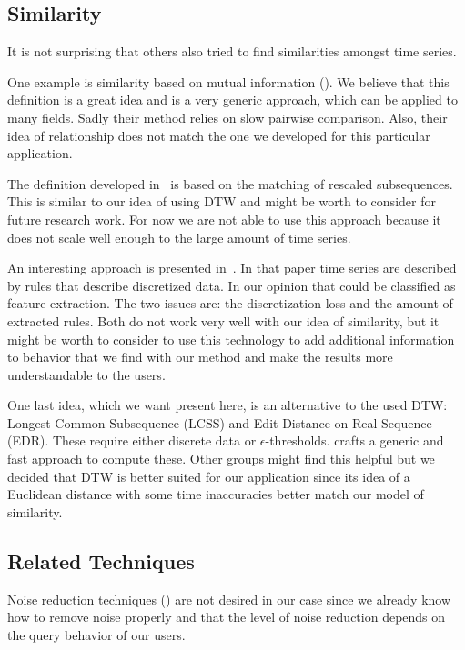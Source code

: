 \subsection{Similarity}
\label{ssec:baseline:prior:sim}

It is not surprising that others also tried to find similarities amongst time series.

One example is similarity based on mutual information (\cite{MISE}). We believe that this definition is a great idea and is a very generic approach, which can be applied to many fields. Sadly their method relies on slow pairwise comparison. Also, their idea of relationship does not match the one we developed for this particular application.

The definition developed in~\cite{sim1} is based on the matching of rescaled subsequences. This is similar to our idea of using DTW and might be worth to consider for future research work. For now we are not able to use this approach because it does not scale well enough to the large amount of time series.

An interesting approach is presented in~\cite{sim2}. In that paper time series are described by rules that describe discretized data. In our opinion that could be classified as feature extraction. The two issues are: the discretization loss and the amount of extracted rules. Both do not work very well with our idea of similarity, but it might be worth to consider to use this technology to add additional information to behavior that we find with our method and make the results more understandable to the users.

One last idea, which we want present here, is an alternative to the used DTW\@: Longest Common Subsequence (LCSS) and Edit Distance on Real Sequence (EDR). These require either discrete data or $\epsilon$-thresholds. \cite{sim3} crafts a generic and fast approach to compute these. Other groups might find this helpful but we decided that DTW is better suited for our application since its idea of a Euclidean distance with some time inaccuracies better match our model of similarity.


\subsection{Related Techniques}
\label{ssec:baseline:prior:other}

Noise reduction techniques (\cite{noise1}) are not desired in our case since we already know how to remove noise properly and that the level of noise reduction depends on the query behavior of our users.



